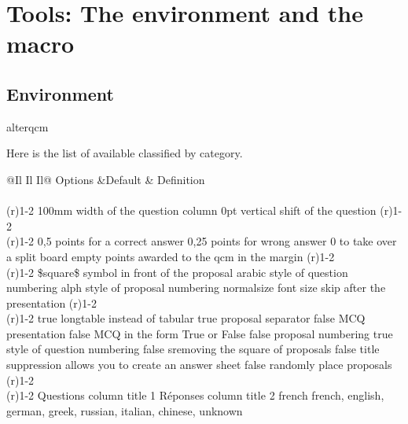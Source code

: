 \section{Tools: The environment  and the macro }
\subsection{Environment }


\bigskip
\begin{NewEnvBox}{alterqcm}

\noindent Here is the list of available  classified by category.

\medskip
\begin{tabular}{@{}Il Il Il@{}}
  \toprule
  \thead
Options                &Default & Definition                                \\ \midrule
\tbody
{} \\ \cmidrule(r){1-2}
        {100mm}  {width of the question column            }
        {0pt}    {vertical shift of the question       } \cmidrule(r){1-2}
 \\ \cmidrule(r){1-2}
     {{0,5}}  {points for a correct answer      }
     {{0,25}} {points for wrong answer   }
  {0}    {to take over a split board          }
  {empty}{ points awarded to the qcm in the margin} \cmidrule(r){1-2}
 \\ \cmidrule(r){1-2}
      {\$\BS square\$} {symbol in front of the proposal     }
  {\BS arabic} {style of question numbering  }
 {\BS alph} {style of proposal numbering }
  {\BS normalsize} {font size           }
 {skip after the presentation  }
\cmidrule(r){1-2}
 \\ \cmidrule(r){1-2}
 {true}     {longtable instead of tabular   }
 {true}  {proposal separator}
 {false}  {MCQ presentation          }
 {false}  {MCQ in the form True or False }
   {false}  {proposal numbering    }
       {true}   {style of question numbering  }
  {false}   {sremoving the square of proposals     }
     {false} {title suppression                    }
 {allows you to create an answer sheet                }
      {false}  {randomly place proposals     } \cmidrule(r){1-2}
 \\ \cmidrule(r){1-2}
     {Questions} {column title 1                           }
     {R\'eponses} {column title 2     }
  {french}  {french, english, german, greek, russian, italian, chinese, unknown }
 \bottomrule
\end{tabular}


\end{NewEnvBox}
